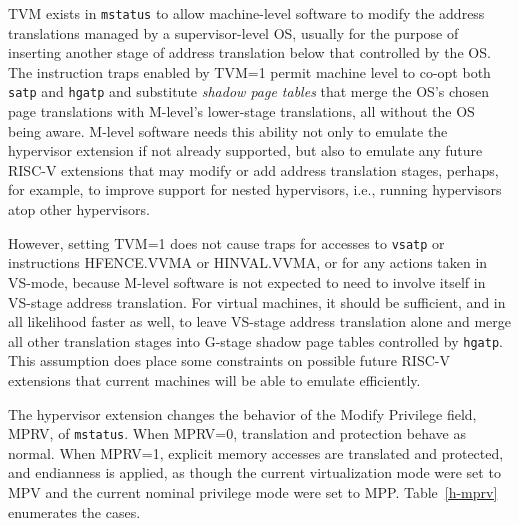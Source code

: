 \begin{commentary}
TVM exists in {\tt mstatus} to allow machine-level software to modify
the address translations managed by a supervisor-level OS, usually for
the purpose of inserting another stage of address translation below
that controlled by the OS.
The instruction traps enabled by TVM=1 permit machine level
to co-opt both {\tt satp} and {\tt hgatp} and substitute
\emph{shadow page tables} that merge the OS's chosen page translations
with M-level's lower-stage translations, all without the OS being
aware.
M-level software needs this ability not only to emulate the hypervisor
extension if not already supported, but also to emulate any future
\mbox{RISC-V} extensions that may modify or add address translation
stages, perhaps, for example, to improve support for nested
hypervisors, i.e., running hypervisors atop other hypervisors.

However, setting TVM=1 does not cause traps for accesses to {\tt vsatp}
or instructions HFENCE.VVMA or HINVAL.VVMA, or for any actions taken
in VS-mode, because M-level software is not expected to need to involve
itself in VS-stage address translation.
For virtual machines, it should be sufficient, and in all likelihood
faster as well, to leave VS-stage address translation alone and merge
all other translation stages into G-stage shadow page tables controlled
by {\tt hgatp}.
This assumption does place some constraints on possible future
\mbox{RISC-V} extensions that current machines will be able to emulate
efficiently.
\end{commentary}

The hypervisor extension changes the behavior of the Modify Privilege field,
MPRV, of {\tt mstatus}.
When MPRV=0, translation and protection behave as normal.
When MPRV=1, explicit memory accesses are translated and protected, and
endianness is applied, as though the current virtualization mode were set
to MPV and the current nominal privilege mode were set to MPP.
Table~\ref{h-mprv} enumerates the cases.

